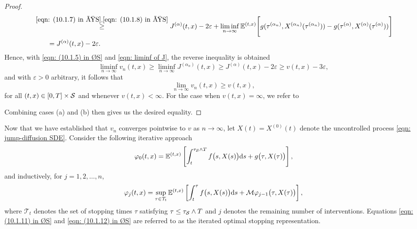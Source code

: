\begin{proof}
\begin{align}
        & \overset{\eqref{eqn: (10.1.7) in ØS}, \eqref{eqn: (10.1.8) in ØS}}{\geq} J^{(\alpha)}(t,x) - 2 \varepsilon + \liminf_{n \rightarrow \infty} \mathbb{E}^{(t,x)}\Bigg[g(\tau^{(\alpha_n)},X^{(\alpha_n)}(\tau^{(\alpha_n)})) - g(\tau^{(\alpha)},X^{(\alpha)}(\tau^{(\alpha)}))\Bigg] \nonumber \\
        & \qquad = J^{(\alpha)}(t,x) - 2\varepsilon.
    \label{eqn: liminf of J}
    \end{align}
    Hence, with \eqref{eqn: (10.1.5) in ØS} and \eqref{eqn: liminf of J}, the reverse inequality is obtained
    \begin{equation*}
        \liminf_{n \rightarrow \infty} v_n(t,x) \geq \liminf_{n \rightarrow \infty} J^{(\alpha_n)}(t,x) \geq J^{(\alpha)}(t,x) - 2\varepsilon \geq v(t,x) - 3\varepsilon,
    \end{equation*}
    and with $\varepsilon > 0$ arbitrary, it follows that 
    \begin{equation*}
        \lim_{n \rightarrow \infty} v_n(t,x) \geq v(t,x),
    \end{equation*}
    for all $(t,x) \in [0,T] \times \mathcal{S}$ and whenever $v(t,x) < \infty$. For the case when $v(t,x) = \infty$, we refer to \cite[p.257]{oksendal2007applied}
    
    Combining cases (a) and (b) then gives us the desired equality.
\end{proof}

Now that we have established that $v_n$ converges pointwise to $v$ as $n \rightarrow \infty$, let $X(t) = X^{(0)}(t)$ denote the uncontrolled process \eqref{eqn: jump-diffusion SDE}. Consider the following iterative approach
\begin{equation}
    \varphi_0(t,x) = \mathbb{E}^{(t,x)} \left[\int_t^{\tau_{\mathcal{S}} \wedge T} f\big(s,X(s)\big) \mathrm{d} s + g\big(\tau,X(\tau)\big) \right],
    \label{eqn: (10.1.11) in ØS}
\end{equation}
and inductively, for $j=1,2,\ldots,n$,
\begin{equation}
    \varphi_j(t,x) = \sup_{\tau \in \mathcal{T}_t} \mathbb{E}^{(t,x)} \left[\int_t^{\tau} f\big(s,X(s)\big) \mathrm{d} s + \mathcal{M} \varphi_{j-1}\big(\tau, X(\tau)\big) \right],
    \label{eqn: (10.1.12) in ØS}
\end{equation}
where $\mathcal{T}_t$ denotes the set of stopping times $\tau$ satisfying $\tau \leq \tau_{\mathcal{S}} \wedge T$ and $j$ denotes the remaining number of interventions. Equations \eqref{eqn: (10.1.11) in ØS} and \eqref{eqn: (10.1.12) in ØS} are referred to as the iterated optimal stopping representation. 

